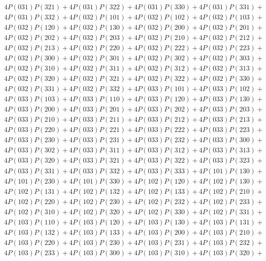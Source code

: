 \begin{align*}
	4P(031)P(321) + 4P(031)P(322) + 4P(031)P(330) + 4P(031)P(331)+ \\ 
	4P(031)P(332) + 4P(032)P(101) + 4P(032)P(102) + 4P(032)P(103)+ \\ 
	4P(032)P(120) + 4P(032)P(130) + 4P(032)P(200) + 4P(032)P(201)+ \\ 
	4P(032)P(202) + 4P(032)P(203) + 4P(032)P(210) + 4P(032)P(212)+ \\ 
	4P(032)P(213) + 4P(032)P(220) + 4P(032)P(222) + 4P(032)P(223)+ \\ 
	4P(032)P(300) + 4P(032)P(301) + 4P(032)P(302) + 4P(032)P(303)+ \\ 
	4P(032)P(310) + 4P(032)P(311) + 4P(032)P(312) + 4P(032)P(313)+ \\ 
	4P(032)P(320) + 4P(032)P(321) + 4P(032)P(322) + 4P(032)P(330)+ \\ 
	4P(032)P(331) + 4P(032)P(332) + 4P(033)P(101) + 4P(033)P(102)+ \\ 
	4P(033)P(103) + 4P(033)P(110) + 4P(033)P(120) + 4P(033)P(130)+ \\ 
	4P(033)P(200) + 4P(033)P(201) + 4P(033)P(202) + 4P(033)P(203)+ \\ 
	4P(033)P(210) + 4P(033)P(211) + 4P(033)P(212) + 4P(033)P(213)+ \\ 
	4P(033)P(220) + 4P(033)P(221) + 4P(033)P(222) + 4P(033)P(223)+ \\ 
	4P(033)P(230) + 4P(033)P(231) + 4P(033)P(232) + 4P(033)P(300)+ \\ 
	4P(033)P(302) + 4P(033)P(311) + 4P(033)P(312) + 4P(033)P(313)+ \\ 
	4P(033)P(320) + 4P(033)P(321) + 4P(033)P(322) + 4P(033)P(323)+ \\ 
	4P(033)P(331) + 4P(033)P(332) + 4P(033)P(333) + 4P(101)P(130)+ \\ 
	4P(101)P(230) + 4P(101)P(330) + 4P(102)P(120) + 4P(102)P(130)+ \\ 
	4P(102)P(131) + 4P(102)P(132) + 4P(102)P(133) + 4P(102)P(210)+ \\ 
	4P(102)P(220) + 4P(102)P(230) + 4P(102)P(232) + 4P(102)P(233)+ \\ 
	4P(102)P(310) + 4P(102)P(320) + 4P(102)P(330) + 4P(102)P(331)+ \\ 
	4P(103)P(110) + 4P(103)P(120) + 4P(103)P(130) + 4P(103)P(131)+ \\ 
	4P(103)P(132) + 4P(103)P(133) + 4P(103)P(200) + 4P(103)P(210)+ \\ 
	4P(103)P(220) + 4P(103)P(230) + 4P(103)P(231) + 4P(103)P(232)+ \\ 
	4P(103)P(233) + 4P(103)P(300) + 4P(103)P(310) + 4P(103)P(320)+ \\ 

\end{align*}
